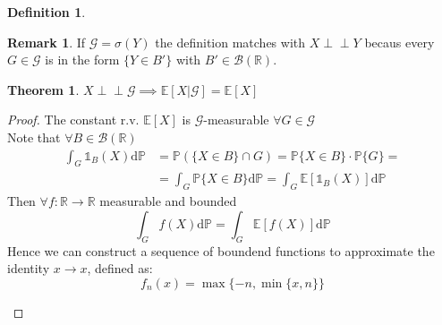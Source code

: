 \documentclass[10pt,a4paper]{article}
\theoremstyle{definition}
\newtheorem{defi}{Definition}[section]
\newtheorem{teo}{Theorem}[section]
\newtheorem*{rem}{Remark}
\newcommand{\indep}{\perp \!\!\! \perp}
\newcommand{\ind}{\mathds{1}}
\begin{document}
\begin{enumerate}
\begin{defi}
\begin{equation*}
	\end{equation*}
\end{defi}
\begin{rem}
	If $\mathcal{G}=\sigma(Y)$ the definition matches with $X \indep Y$ becaus every $ G\in  \mathcal{G} $ is in the form $\{Y\in B'\}$ with $B'\in \mathcal{B}(\mathbb{R})$.
\end{rem}
\begin{teo}
	 $X \indep \mathcal{G} \implies \mathbb{E}[X|\mathcal{G}]=\mathbb{E}[X]$
\end{teo}
\begin{proof}
	The constant r.v. $ \mathbb{E}[X] $ is $\mathcal{G}$-measurable $ \forall G\in  \mathcal{G} $ \\
	Note that $ \forall B\in  \mathcal{B}(\mathbb{R}) $
	\begin{equation*}
		\begin{split}
			\int_{G}\ind_B (X)\mathrm{d}\mathbb{P}&=\mathbb{P}\left(\{X\in B\}\cap G\right)=\mathbb{P}\{X\in B\}\cdot \mathbb{P}\{G\}=\\
			&=\int_{G}\mathbb{P}\{X\in B\}\mathrm{d}\mathbb{P}=\int_{G}\mathbb{E}[\ind_B (X)]\mathrm{d}\mathbb{P}
		\end{split}		
	\end{equation*}
Then $\forall f:\mathbb{R}\to\mathbb{R}$ measurable and bounded
\begin{equation*}
	\int_{G}f (X)\mathrm{d}\mathbb{P}=\int_{G}\mathbb{E}[f (X)]\mathrm{d}\mathbb{P}
\end{equation*}
Hence we can construct a sequence of boundend functions to approximate the identity $x\to x$, defined as:
\begin{equation*}
	f_n(x)=\max \{-n,\min \{x,n\}\}
\end{equation*}
\begin{figure}[htpb]
	\centering
\end{figure}
\end{proof}
\end{enumerate}
\end{document}
